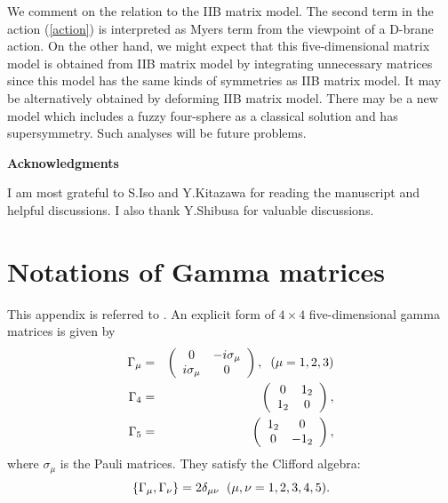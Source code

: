 \documentclass[a4paper,11pt]{article}
\begin{document}
We comment on the relation to the IIB matrix model. 
The second term in the action (\ref{action}) 
is interpreted as Myers term from the viewpoint of 
a D-brane action. 
On the other hand, 
we might expect that this five-dimensional matrix model 
is obtained from IIB matrix model 
by integrating unnecessary matrices 
since this model has the same kinds of symmetries as 
IIB matrix model. 
It may be alternatively obtained by deforming IIB matrix model. 
There may be 
a new model which includes a fuzzy four-sphere as a classical solution 
and has supersymmetry. 
Such analyses will be future problems. 

\vspace{1cm}
\begin{center}
{\bf Acknowledgments}
\end{center}
\hspace{0.4cm}
I am most grateful to S.Iso and Y.Kitazawa 
for reading the manuscript and helpful discussions. 
I also thank Y.Shibusa for valuable discussions. 


\renewcommand{\theequation}{\Alph{section}.\arabic{equation}}
\appendix

\section{Notations of Gamma matrices}
\setcounter{equation}{0} 
\hspace{0.4cm}
This appendix is referred to \cite{castelino}. 
An explicit form of $4\times 4$ five-dimensional 
gamma matrices is given by 
\begin{eqnarray} 
\Gamma_{\mu}  
 &=&   \left( \begin{array}{c c}
  0 & -i\sigma_{\mu} \\ 
 i\sigma_{\mu}  & 0   \\
 \end{array} \right), \hspace{0.2cm}(\mu=1,2,3)     \cr
\Gamma_{4}  
 &=&   \left( \begin{array}{c c}
  0 & 1_{2} \\ 
  1_{2}  & 0   \\
 \end{array} \right) ,     \cr
\Gamma_{5}  
 &=&   \left( \begin{array}{c c}
  1_{2} & 0 \\ 
 0  & -1_{2}   \\
 \end{array} \right),        
\end{eqnarray}
where $\sigma_{\mu}$ is the Pauli matrices. 
They satisfy the Clifford algebra: 
\begin{equation}
\{\Gamma_{\mu} ,\Gamma_{\nu} \}=2\delta_{\mu\nu}
\hspace{0.2cm}(\mu,\nu=1,2,3,4,5).
\end{equation}
\end{document}
